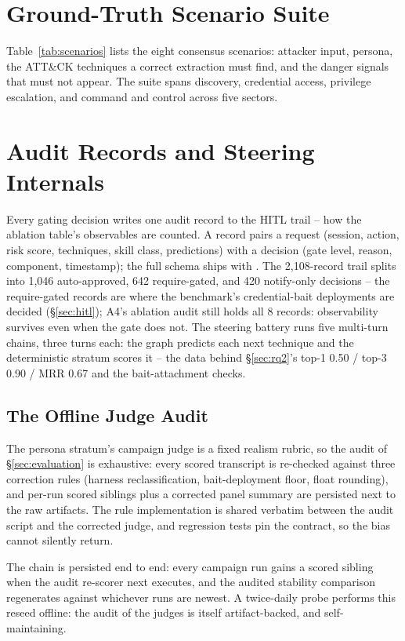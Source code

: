 \section{Ground-Truth Scenario Suite}
\label{app:scenarios}
Table~\ref{tab:scenarios} lists the eight consensus scenarios: attacker
input, persona, the ATT\&CK techniques a correct extraction must find,
and the danger signals that must not appear. The suite spans discovery,
credential access, privilege escalation, and command and control across
five sectors.

\section{Audit Records and Steering Internals}
\label{app:audit}
Every gating decision writes one audit record to the HITL trail -- how
the ablation table's observables are counted. A record pairs a request
(session, action, risk score, techniques, skill class, predictions) with
a decision (gate level, reason, component, timestamp); the full schema
ships with . The 2{,}108-record trail
splits into 1{,}046 auto-approved, 642 require-gated, and 420
notify-only decisions -- the require-gated records are where the
benchmark's credential-bait deployments are decided
(\S\ref{sec:hitl}); A4's ablation audit still holds all 8 records:
observability survives even when the gate does not. The steering battery
runs five multi-turn chains, three turns each: the graph predicts each
next technique and the deterministic stratum scores it -- the data
behind \S\ref{sec:rq2}'s top-1 0.50 / top-3 0.90 / MRR 0.67 and the
bait-attachment checks.\vspace{-2pt}
\subsection{The Offline Judge Audit}
\label{sec:judgeaudit}
The persona stratum's campaign judge is a fixed realism rubric, so the
audit of \S\ref{sec:evaluation} is exhaustive: every scored transcript
is re-checked against three correction rules (harness reclassification,
bait-deployment floor, float rounding), and per-run scored siblings plus
a corrected panel summary are persisted next to the raw artifacts. The
rule implementation is shared verbatim between the audit script and the
corrected judge, and regression tests pin the contract, so the bias
cannot silently return.

The chain is persisted end to end: every campaign run gains a scored
sibling when the audit re-scorer next executes, and the audited
stability comparison regenerates against whichever runs are newest. A
twice-daily probe performs this reseed offline: the audit of the
judges is itself artifact-backed, and self-maintaining.

